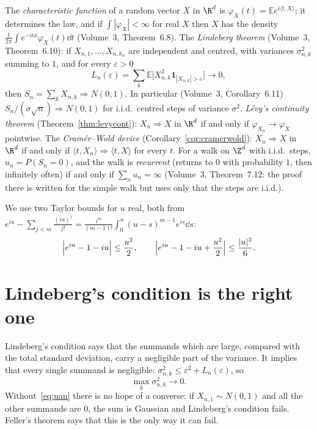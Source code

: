 \begin{reminder}
The \emph{characteristic function} of a random vector $X$ in $\R^d$ is $\varphi_X(t)=\mathbb E e^{i\langle t,X\rangle}$; it determines the law, and if
$\int|\varphi_X|<\infty$ for real $X$ then $X$ has the density $\frac1{2\pi}\int e^{-itx}\varphi_X(t)\dd t$ (Volume~3, Theorem~6.8). The \emph{Lindeberg
theorem} (Volume~3, Theorem~6.10): if $X_{n,1},\dots,X_{n,k_n}$ are independent and centred, with variances $\sigma_{n,k}^2$ summing to $1$, and for
every $\varepsilon>0$
\[
L_n(\varepsilon)=\sum_k\mathbb E\bigl[X_{n,k}^2\mathbf 1_{|X_{n,k}|>\varepsilon}\bigr]\to0,
\]
then $S_n=\sum_kX_{n,k}\Rightarrow N(0,1)$. In particular (Volume~3, Corollary~6.11) $S_n/(\sigma\sqrt n)\Rightarrow N(0,1)$ for i.i.d.\ centred steps of
variance $\sigma^2$. \emph{L\'evy's continuity theorem} (Theorem~\ref{thm:levycont}): $X_n\Rightarrow X$ in $\R^d$ if and only if
$\varphi_{X_n}\to\varphi_X$ pointwise. The \emph{Cram\'er--Wold device} (Corollary~\ref{cor:cramerwold}): $X_n\Rightarrow X$ in $\R^d$ if and
only if $\langle t,X_n\rangle\Rightarrow\langle t,X\rangle$ for every $t$. For a walk on $\Z^d$ with i.i.d.\ steps, $u_n=P(S_n=0)$, and the walk is
\emph{recurrent} (returns to $0$ with probability $1$, then infinitely often) if and only if $\sum_nu_n=\infty$ (Volume~3, Theorem~7.12: the proof
there is written for the simple walk but uses only that the steps are i.i.d.).
\end{reminder}

We use two Taylor bounds for $u$ real, both from $e^{iu}-\sum_{j<m}\frac{(iu)^j}{j!}=\frac{i^m}{(m-1)!}\int_0^u(u-s)^{m-1}e^{is}\dd s$:
\begin{equation}\label{eq:taylor}
\Bigl|e^{iu}-1-iu\Bigr|\le\frac{u^2}2,\qquad\Bigl|e^{iu}-1-iu+\frac{u^2}2\Bigr|\le\frac{|u|^3}6.
\end{equation}

\section{Lindeberg's condition is the right one}

Lindeberg's condition says that the summands which are large, compared with the total standard deviation, carry a negligible part of the variance.
It implies that every single summand is negligible: $\sigma_{n,k}^2\le\varepsilon^2+L_n(\varepsilon)$, so
\begin{equation}\label{eq:uan}
\max_k\sigma_{n,k}^2\to0.
\end{equation}
Without~\eqref{eq:uan} there is no hope of a converse: if $X_{n,1}\sim N(0,1)$ and all the other summands are $0$, the sum is Gaussian and Lindeberg's
condition fails. Feller's theorem says that this is the only way it can fail.

